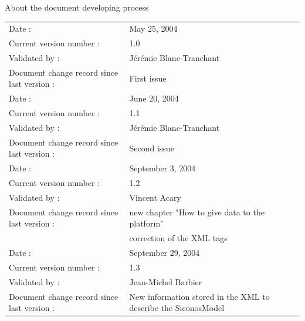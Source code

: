 \pagebreak
\begin{center}
  \textsf{\Large About the document developing process}
\end{center}
\begin{tabular}{|p{}|p{}|}
\hline
Date : &\textsf{May 25, 2004}\\
Current version number : &\textsf{1.0}\\ 
Validated by :& \textsf{J\'er\'emie Blanc-Tranchant}\\
\hline
Document change record since last version : &\textsf{First issue} \\
\hline
\hline
Date : &\textsf{June 20, 2004}\\
Current version number : &\textsf{1.1}\\ 
Validated by :& \textsf{J\'er\'emie Blanc-Tranchant}\\
\hline
Document change record since last version : &\textsf{Second issue} \\
\hline
\hline
Date : &\textsf{September 3, 2004}\\
Current version number : &\textsf{1.2}\\ 
Validated by :& \textsf{Vincent Acary}\\
\hline
Document change record since last version : &\textsf{new chapter "How to give data to the platform"} \\
& \textsf{correction of the XML tags} \\
\hline
\hline
Date : &\textsf{September 29, 2004}\\
Current version number : &\textsf{1.3}\\ 
Validated by :& \textsf{Jean-Michel Barbier}\\
\hline
Document change record since last version : &\textsf{New information stored in the XML to describe the SiconosModel} \\
\hline
\end{tabular}



%

